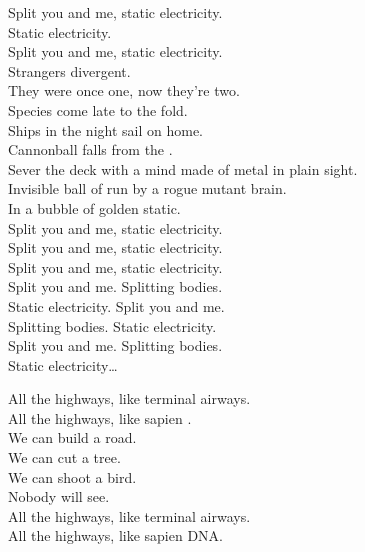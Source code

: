 Split you and me, static electricity. \\
Static electricity. \\
Split you and me, static electricity. \\

Strangers divergent. \\
They were once one, now they're two. \\
Species come late to the fold. \\
Ships in the night sail on home. \\
Cannonball falls from the . \\
Sever the deck with a mind made of metal in plain sight. \\
Invisible ball of  run by a rogue mutant brain. \\
In a bubble of golden static. \\

Split you and me, static electricity. \\
Split you and me, static electricity. \\
Split you and me, static electricity. \\

Split you and me. Splitting bodies. \\
Static electricity. Split you and me. \\
Splitting bodies. Static electricity. \\
Split you and me. Splitting bodies. \\
Static electricity… \\




All the highways, like terminal airways. \\
All the highways, like sapien . \\

We can build a road. \\
We can cut a tree. \\
We can shoot a bird. \\
Nobody will see. \\

All the highways, like terminal airways. \\
All the highways, like sapien DNA. \\

